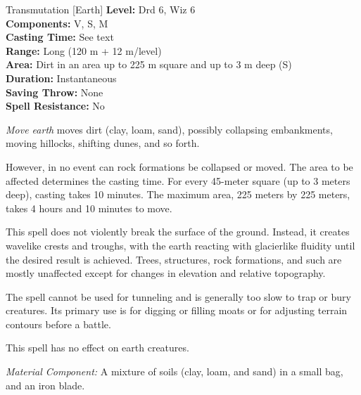 {Transmutation [Earth]}
{
	\textbf{Level:}
	Drd 6, Wiz 6\\
	\textbf{Components:}
	V, S, M\\
	\textbf{Casting Time:}
	See text\\
	\textbf{Range:}
	Long (120 m + 12 m/level)\\
	\textbf{Area:}
	Dirt in an area up to 225 m square and up to 3 m deep (S)\\
	\textbf{Duration:}
	Instantaneous\\
	\textbf{Saving Throw:}
	None\\
	\textbf{Spell Resistance:}
	No\\
}
{
	\emph{Move earth} moves dirt (clay, loam, sand), possibly collapsing embankments, moving hillocks, shifting dunes, and so forth.

	However, in no event can rock formations be collapsed or moved. The area to be affected determines the casting time. For every 45-meter square (up to 3 meters deep), casting takes 10 minutes. The maximum area, 225 meters by 225 meters, takes 4 hours and 10 minutes to move.

	This spell does not violently break the surface of the ground. Instead, it creates wavelike crests and troughs, with the earth reacting with glacierlike fluidity until the desired result is achieved. Trees, structures, rock formations, and such are mostly unaffected except for changes in elevation and relative topography.

	The spell cannot be used for tunneling and is generally too slow to trap or bury creatures. Its primary use is for digging or filling moats or for adjusting terrain contours before a battle.

	This spell has no effect on earth creatures.

	\textit{Material Component:}
	A mixture of soils (clay, loam, and sand) in a small bag, and an iron blade.

}
